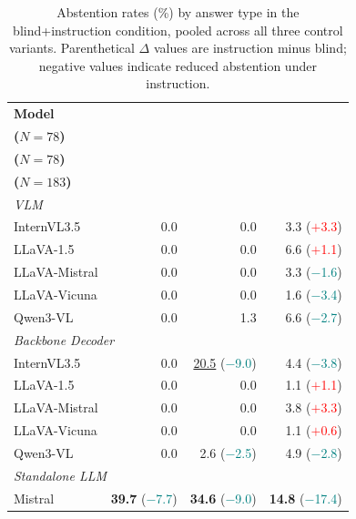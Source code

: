 \begin{table}[ht]
\centering
\small
\setlength{\tabcolsep}{3.5pt}
\renewcommand{\arraystretch}{0.93}
\caption{Abstention rates (\%) by answer type in the blind+instruction condition, pooled across all three control variants. Parenthetical $\Delta$ values are instruction minus blind; negative values indicate reduced abstention under instruction.}
\label{tab:abstention_by_qtype}
\begin{tabular}{lrrr}
\toprule
\textbf{Model}
  & \makecell[r]{\textbf{Yes/No} \\ \textbf{($N{=}78$)}}
  & \makecell[r]{\textbf{Count} \\ \textbf{($N{=}78$)}}
  & \makecell[r]{\textbf{Free Text} \\ \textbf{($N{=}183$)}} \\
\midrule
\multicolumn{4}{l}{\textit{VLM}} \\
\quad InternVL3.5     & 0.0 & 0.0 & 3.3 {\scriptsize(\textcolor{red}{$+$3.3})} \\
\quad LLaVA-1.5      & 0.0 & 0.0 & 6.6 {\scriptsize(\textcolor{red}{$+$1.1})} \\
\quad LLaVA-Mistral  & 0.0 & 0.0 & 3.3 {\scriptsize(\textcolor{teal}{$-$1.6})} \\
\quad LLaVA-Vicuna   & 0.0 & 0.0 & 1.6 {\scriptsize(\textcolor{teal}{$-$3.4})} \\
\quad Qwen3-VL       & 0.0 & 1.3 & 6.6 {\scriptsize(\textcolor{teal}{$-$2.7})} \\
\midrule
\multicolumn{4}{l}{\textit{Backbone Decoder}} \\
\quad InternVL3.5    & 0.0 & \underline{20.5} {\scriptsize(\textcolor{teal}{$-$9.0})} &  4.4 {\scriptsize(\textcolor{teal}{$-$3.8})} \\
\quad LLaVA-1.5      & 0.0 & 0.0 &  1.1 {\scriptsize(\textcolor{red}{$+$1.1})} \\
\quad LLaVA-Mistral  & 0.0 & 0.0 &  3.8 {\scriptsize(\textcolor{red}{$+$3.3})} \\
\quad LLaVA-Vicuna   & 0.0 & 0.0 &  1.1 {\scriptsize(\textcolor{red}{$+$0.6})} \\
\quad Qwen3-VL       & 0.0 & 2.6 {\scriptsize(\textcolor{teal}{$-$2.5})} &  4.9 {\scriptsize(\textcolor{teal}{$-$2.8})} \\
\midrule
\multicolumn{4}{l}{\textit{Standalone LLM}} \\
\quad Mistral        & \textbf{39.7} {\scriptsize(\textcolor{teal}{$-$7.7})} & \textbf{34.6} {\scriptsize(\textcolor{teal}{$-$9.0})} & \textbf{14.8} {\scriptsize(\textcolor{teal}{$-$17.4})} \\

\end{tabular}
\end{table}

